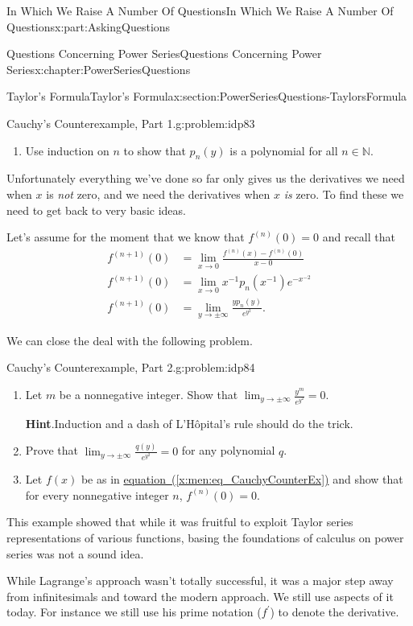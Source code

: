 \documentclass[oneside,10pt,]{book}
\newcommand{\blocktitlefont}{\relax}
\newcommand{\xreffont}{\relax}
\numberwithin{equation}{section}
\def\limit#1#2#3{{\displaystyle\lim_{#1\rightarrow #2}#3}}
\newcommand{\NN}{\mathbb {N}}
\newcommand{\amp}{&}
\begin{document}
\begin{partptx}{In Which We Raise A Number Of Questions}{}{In Which We Raise A Number Of Questions}{}{}{x:part:AskingQuestions}
\begin{chapterptx}{Questions Concerning Power Series}{}{Questions Concerning Power Series}{}{}{x:chapter:PowerSeriesQuestions}
\begin{sectionptx}{Taylor's Formula}{}{Taylor's Formula}{}{}{x:section:PowerSeriesQuestions-TaylorsFormula}
\begin{problem}{Cauchy's Counterexample, Part 1.}{g:problem:idp83}
\begin{enumerate}[font=\bfseries,label=(\alph*),ref=\alph*]
\item{}Use induction on \(n\) to show that \(p_n(y)\) is a polynomial for all \(n\in\NN\).%
\end{enumerate}
\end{problem}
Unfortunately everything we've done so far only gives us the derivatives we need when \(x\) is \emph{not} zero, and we need the derivatives when \(x\) \emph{is} zero. To find these we need to get back to very basic ideas.%
\par
Let's assume for the moment that we know that \(f^{(n)}(0)=0\) and recall that%
\begin{align*}
f^{(n+1)}(0) \amp = \limit{x}{0}{\frac{f^{(n)}(x)-f^{(n)}(0)}{x-0}}\\
f^{(n+1)}(0) \amp = \limit{x}{0}{x^{-1}p_n(x^{-1})e^{-x^{-2}}}\\
f^{(n+1)}(0) \amp = \limit{y}{\pm\infty}{\frac{yp_n(y)}{e^{y^2}}}\text{.}
\end{align*}
%
\par
We can close the deal with the following problem.%
\begin{problem}{Cauchy's Counterexample, Part 2.}{g:problem:idp84}%
\begin{enumerate}[font=\bfseries,label=(\alph*),ref=\alph*]
\item{}Let \(m\) be a nonnegative integer. Show that \(\limit{y}{\pm\infty}{\frac{y^m}{e^{y^2}}}=0\).%
\par\smallskip%
\noindent\textbf{\blocktitlefont Hint}.\hypertarget{g:hint:idp85}{}\quad{}Induction and a dash of L'Hôpital's rule should do the trick.%
\item{}Prove that \(\limit{y}{\pm\infty}{\frac{q(y)}{e^{y^2}}}=0\) for any polynomial \(q\).%
\item{}Let \(f(x)\) be as in \hyperref[x:men:eq_CauchyCounterEx]{equation~({\xreffont\ref{x:men:eq_CauchyCounterEx}})} and show that for every nonnegative integer \(n\), \(f^{(n)}(0)=0\).%
\end{enumerate}
\end{problem}
This example showed that while it was fruitful to exploit Taylor series representations of various functions, basing the foundations of calculus on power series was not a sound idea.%
\par
While Lagrange's  approach wasn't totally successful, it was a major step away from infinitesimals and toward the modern approach. We still use aspects of it today. For instance we still use his prime notation (\(f^\prime\)) to denote the derivative.%

\end{sectionptx}
\end{chapterptx}
\end{partptx}
\end{document}
